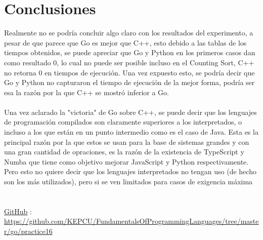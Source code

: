 \documentclass[https://www.overleaf.com/project/63761df255a8a9f4a15c3579
	letterpaper, %
	10pt, %
]{CSUniSchoolLabReport}
\begin{document}

\section{Conclusiones}

Realmente no se podría concluir algo claro con los resultados del experimento, a pesar de que parece que Go es mejor que C++, esto debido a las tablas de los tiempos obtenidos, se puede apreciar que Go y Python en los primeros casos dan como resultado 0, lo cual no puede ser posible incluso en el Counting Sort, C++ no retorna 0 en tiempos de ejecución. 
Una vez expuesto esto, se podría decir que Go y Python no capturaron el tiempo de ejecución de la mejor forma, podría ser esa la razón por la que C++ se mostró inferior a Go. \\\\
Una vez aclarado la "victoria" de Go sobre C++, se puede decir que los lenguajes de programación compilados son claramente superiores a los interpretados, o incluso a los que están en un punto intermedio como es el caso de Java. Esta es la principal razón por la que estos se usan para la base de sistemas grandes y con una gran cantidad de opraciones, es la razón de la existencia de TypeScript y Numba que tiene como objetivo mejorar JavaScript y Python respectivamente. Pero esto no quiere decir que los lenguajes interpretados no tengan uso (de hecho son los más utilizados), pero si se ven limitados para casos de exigencia máxima  \\\\\\



\href{https://github.com/KEPCU/FundamentalsOfProgrammingLanguages/tree/master/go/practice16}{GitHub} : \url{https://github.com/KEPCU/FundamentalsOfProgrammingLanguages/tree/master/go/practice16}

\end{document}
